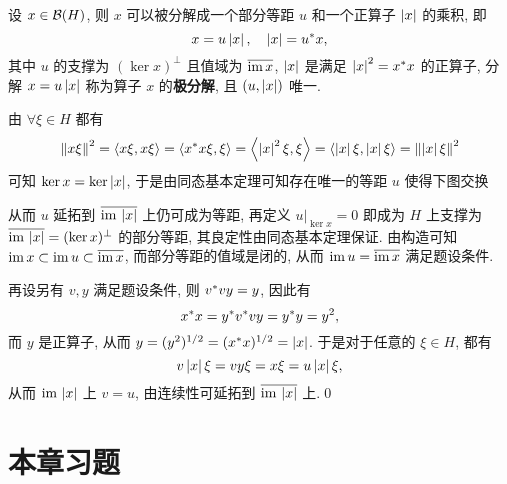     \begin{Theorem}[极分解定理]
        设 $ x\in\mathcal{B}(H) $, 则 $ x $ 可以被分解成一个部分等距 $ u $ 和一个正算子 $ \left| x \right|  $ 的乘积, 即
        \[
            x=u\left| x \right| ,\quad \left| x \right| =u^{*}x,
        \]
        其中 $ u $ 的支撑为 $ (\ker x)^\bot $ 且值域为 $ \overline{\mathrm{im}\, x} $, $ \left| x \right|  $ 是满足 $ \left| x \right| ^2=x^{*}x $ 的正算子, 分解 $ x=u\left| x \right|  $ 称为算子 $ x $ 的\textbf{极分解}, 且 $ (u,\left| x \right| ) $ 唯一.
    \end{Theorem}
    \begin{Proof}
        由 $ \forall\xi\in H $ 都有
        \[
            \left\| x\xi \right\|^2=\left\langle x\xi,x\xi \right\rangle=\left\langle x^{*}x\xi,\xi \right\rangle=\left\langle \left| x \right| ^2\xi,\xi \right\rangle=\left\langle \left| x \right| \xi,\left| x \right| \xi \right\rangle=\left\| \left| x \right| \xi \right\|^2
        \]
        可知 $ \ker x=\ker\left| x \right|  $, 于是由同态基本定理可知存在唯一的等距 $ u $ 使得下图交换
        \begin{center}
        \end{center}
        从而 $ u $ 延拓到 $ \overline{\mathrm{im}\,\left| x \right| } $ 上仍可成为等距, 再定义 $ u|_{\ker x}=0 $ 即成为 $ H $ 上支撑为 $ \overline{\mathrm{im}\, \left| x \right| }=(\ker x)^\bot $ 的部分等距, 其良定性由同态基本定理保证. 由构造可知 $ \mathrm{im}\, x\subset\mathrm{im}\, u\subset\overline{\mathrm{im}\, x} $, 而部分等距的值域是闭的, 从而 $ \mathrm{im}\, u=\overline{\mathrm{im}\, x} $ 满足题设条件.

        再设另有 $ v,y $ 满足题设条件, 则 $ v^{*}vy=y $, 因此有
        \[
            x^{*}x=y^{*}v^{*}vy=y^{*}y=y^2,
        \]
        而 $ y $ 是正算子, 从而 $ y=(y^2)^{1/2}=(x^{*}x)^{1/2}=\left| x \right|  $. 于是对于任意的 $ \xi\in H $, 都有
        \[
            v\left| x \right| \xi=vy\xi=x\xi=u\left| x \right| \xi,
        \]
        从而 $ \mathrm{im}\,\left| x \right|  $ 上 $ v=u $, 由连续性可延拓到 $ \overline{\mathrm{im}\,\left| x \right| } $ 上.\qed
    \end{Proof}
	
\section*{本章习题}
	
